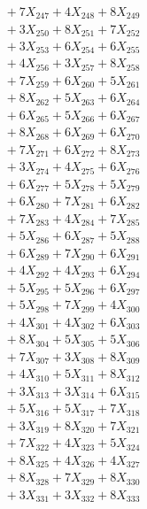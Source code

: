 \documentclass[a4paper,10pt]{article}
\begin{document}
{\begin{align}
&\;  + 7 X_{247} + 4 X_{248} + 8 X_{249} \\[0.5ex]\allowbreak
&\;  + 3 X_{250} + 8 X_{251} + 7 X_{252} \\[0.3ex]
&\;  + 3 X_{253} + 6 X_{254} + 6 X_{255} \\[0.3ex]
&\;  + 4 X_{256} + 3 X_{257} + 8 X_{258} \\[0.3ex]
&\;  + 7 X_{259} + 6 X_{260} + 5 X_{261} \\[0.3ex]
&\;  + 8 X_{262} + 5 X_{263} + 6 X_{264} \\[0.3ex]
&\;  + 6 X_{265} + 5 X_{266} + 6 X_{267} \\[0.3ex]
&\;  + 8 X_{268} + 6 X_{269} + 6 X_{270} \\[0.3ex]
&\;  + 7 X_{271} + 6 X_{272} + 8 X_{273} \\[0.3ex]
&\;  + 3 X_{274} + 4 X_{275} + 6 X_{276} \\[0.3ex]
&\;  + 6 X_{277} + 5 X_{278} + 5 X_{279} \\[0.5ex]\allowbreak
&\;  + 6 X_{280} + 7 X_{281} + 6 X_{282} \\[0.3ex]
&\;  + 7 X_{283} + 4 X_{284} + 7 X_{285} \\[0.3ex]
&\;  + 5 X_{286} + 6 X_{287} + 5 X_{288} \\[0.3ex]
&\;  + 6 X_{289} + 7 X_{290} + 6 X_{291} \\[0.3ex]
&\;  + 4 X_{292} + 4 X_{293} + 6 X_{294} \\[0.3ex]
&\;  + 5 X_{295} + 5 X_{296} + 6 X_{297} \\[0.3ex]
&\;  + 5 X_{298} + 7 X_{299} + 4 X_{300} \\[0.3ex]
&\;  + 4 X_{301} + 4 X_{302} + 6 X_{303} \\[0.3ex]
&\;  + 8 X_{304} + 5 X_{305} + 5 X_{306} \\[0.3ex]
&\;  + 7 X_{307} + 3 X_{308} + 8 X_{309} \\[0.5ex]\allowbreak
&\;  + 4 X_{310} + 5 X_{311} + 8 X_{312} \\[0.3ex]
&\;  + 3 X_{313} + 3 X_{314} + 6 X_{315} \\[0.3ex]
&\;  + 5 X_{316} + 5 X_{317} + 7 X_{318} \\[0.3ex]
&\;  + 3 X_{319} + 8 X_{320} + 7 X_{321} \\[0.3ex]
&\;  + 7 X_{322} + 4 X_{323} + 5 X_{324} \\[0.3ex]
&\;  + 8 X_{325} + 4 X_{326} + 4 X_{327} \\[0.3ex]
&\;  + 8 X_{328} + 7 X_{329} + 8 X_{330} \\[0.3ex]
&\;  + 3 X_{331} + 3 X_{332} + 8 X_{333} \\[0.3ex]

\end{align}}
\end{document}
